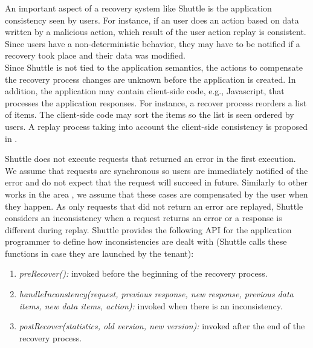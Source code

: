 An important aspect of a recovery system like Shuttle is the application consistency seen by users. For instance, if an user does an action based on data written by a malicious action, which result of the user action replay is consistent. Since users have a non-deterministic behavior, they may have to be notified if a recovery took place and their data was modified. \\


Since Shuttle is not tied to the application semantics, the actions to compensate the recovery process changes are unknown before the application is created. In addition, the application may contain client-side code, e.g., Javascript, that processes the application responses. For instance, a recover process reorders a list of items. The client-side code may sort the items so the list is seen ordered by users. A replay process taking into account the client-side consistency is proposed in \cite{warp}.


Shuttle does not execute requests that returned an error in the first execution. We assume that requests are synchronous so users are immediately notified of the error and do not expect that the request will succeed in future. Similarly to other works in the area \cite{undoForOperators}, we assume that these cases are compensated by the user when they happen. As only requests that did not return an error are replayed, Shuttle considers an inconsistency when a request returns an error or a response is different during replay. Shuttle provides the following \ac{API} for the application programmer to define how inconsistencies are dealt with (Shuttle calls these functions in case they are launched by the tenant):

\begin{enumerate}
  \item \textit{preRecover():} invoked before the beginning of the recovery process.
  \item \textit{handleInconstency(request, previous response, new response, previous data items, new data items, action):} invoked when there is an inconsistency.
  \item \textit{postRecover(statistics, old version, new version):} invoked after the end of the recovery process.
\end{enumerate}

